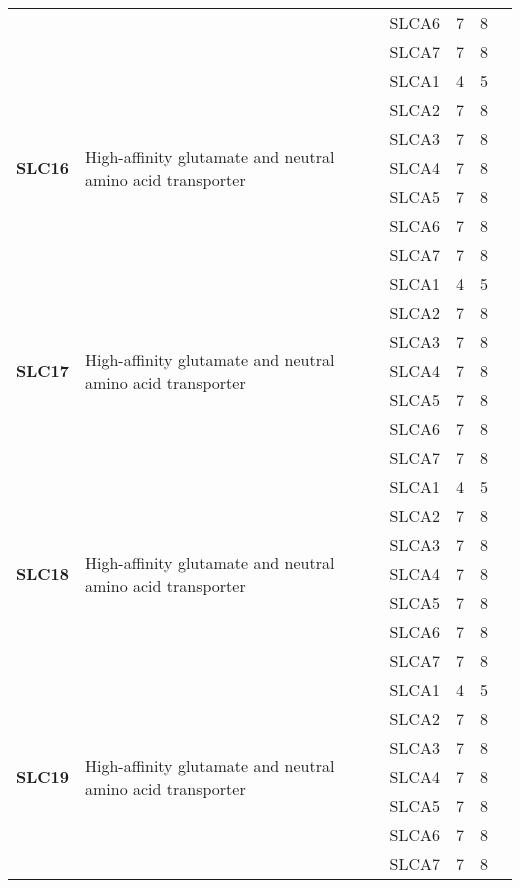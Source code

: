 \documentclass[12pt]{report}
\begin{document}
\begin{center}
\begin{longtable}{|p{1.5cm}|p{3.2cm}|p{1.9cm}|p{1.65cm}|p{3cm}|p{3cm}|}
\cline{3-6}
&&SLCA6&7 & 8&\\ 
\cline{3-6}
&&SLCA7&7 & 8&\\ 
\hline
\multirow{7}{1.5cm}{\textbf{SLC16}} & \multirow{7}{4cm}{High-affinity glutamate and neutral amino acid transporter} & SLCA1 & 4 & 5\\ 
\cline{3-6}
&&SLCA2&7 & 8&\\ 
\cline{3-6}
&&SLCA3&7 & 8&\\ 
\cline{3-6}
&&SLCA4&7 & 8&\\ 
\cline{3-6}
&&SLCA5&7 & 8&\\ 
\cline{3-6}
&&SLCA6&7 & 8&\\ 
\cline{3-6}
&&SLCA7&7 & 8&\\ 
\hline
\multirow{7}{1.5cm}{\textbf{SLC17}} & \multirow{7}{4cm}{High-affinity glutamate and neutral amino acid transporter} & SLCA1 & 4 & 5\\ 
\cline{3-6}
&&SLCA2&7 & 8&\\ 
\cline{3-6}
&&SLCA3&7 & 8&\\ 
\cline{3-6}
&&SLCA4&7 & 8&\\ 
\cline{3-6}
&&SLCA5&7 & 8&\\ 
\cline{3-6}
&&SLCA6&7 & 8&\\ 
\cline{3-6}
&&SLCA7&7 & 8&\\ 
\hline
\multirow{7}{1.5cm}{\textbf{SLC18}} & \multirow{7}{4cm}{High-affinity glutamate and neutral amino acid transporter} & SLCA1 & 4 & 5\\ 
\cline{3-6}
&&SLCA2&7 & 8&\\ 
\cline{3-6}
&&SLCA3&7 & 8&\\ 
\cline{3-6}
&&SLCA4&7 & 8&\\ 
\cline{3-6}
&&SLCA5&7 & 8&\\ 
\cline{3-6}
&&SLCA6&7 & 8&\\ 
\cline{3-6}
&&SLCA7&7 & 8&\\ 
\hline
\multirow{7}{1.5cm}{\textbf{SLC19}} & \multirow{7}{4cm}{High-affinity glutamate and neutral amino acid transporter} & SLCA1 & 4 & 5\\ 
\cline{3-6}
&&SLCA2&7 & 8&\\ 
\cline{3-6}
&&SLCA3&7 & 8&\\ 
\cline{3-6}
&&SLCA4&7 & 8&\\ 
\cline{3-6}
&&SLCA5&7 & 8&\\ 
\cline{3-6}
&&SLCA6&7 & 8&\\ 
\cline{3-6}
&&SLCA7&7 & 8&\\ 

\end{longtable}
\end{center}
\end{document}
